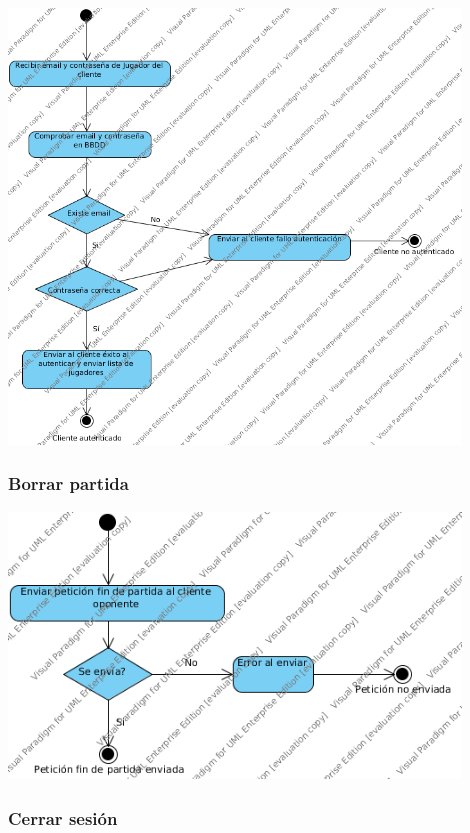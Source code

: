 \documentclass[a4paper,11pt,oneside]{article}
\begin{document}
\includegraphics[width=0.9\textwidth]{img/ms_AutenticarServidor.png}\\[1cm]

\subsubsection{Borrar partida}

\includegraphics[width=0.9\textwidth]{img/ms_BorrarPartidaServidor.png}\\[1cm]

\subsubsection{Cerrar sesión}
\end{document}
